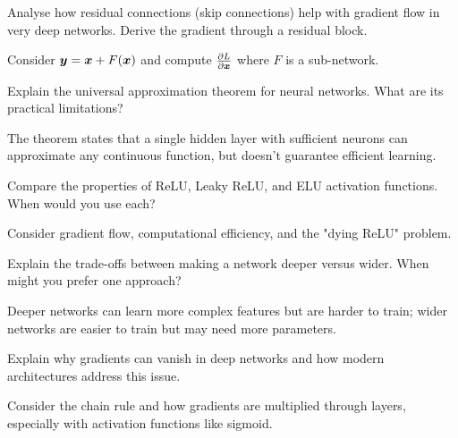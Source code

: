\begin{exercisebox}[hard]
\begin{problem}
Analyse how residual connections (skip connections) help with gradient flow in very deep networks. Derive the gradient through a residual block.
\end{problem}
\begin{hintbox}
Consider $\boldsymbol{y} = \boldsymbol{x} + F(\boldsymbol{x})$ and compute $\frac{\partial L}{\partial \boldsymbol{x}}$ where $F$ is a sub-network.
\end{hintbox}
\end{exercisebox}


\begin{exercisebox}[hard]
\begin{problem}
Explain the universal approximation theorem for neural networks. What are its practical limitations?
\end{problem}
\begin{hintbox}
The theorem states that a single hidden layer with sufficient neurons can approximate any continuous function, but doesn't guarantee efficient learning.
\end{hintbox}
\end{exercisebox}


\begin{exercisebox}[hard]
\begin{problem}
Compare the properties of ReLU, Leaky ReLU, and ELU activation functions. When would you use each?
\end{problem}
\begin{hintbox}
Consider gradient flow, computational efficiency, and the "dying ReLU" problem.
\end{hintbox}
\end{exercisebox}


\begin{exercisebox}[hard]
\begin{problem}
Explain the trade-offs between making a network deeper versus wider. When might you prefer one approach?
\end{problem}
\begin{hintbox}
Deeper networks can learn more complex features but are harder to train; wider networks are easier to train but may need more parameters.
\end{hintbox}
\end{exercisebox}


\begin{exercisebox}[hard]
\begin{problem}
Explain why gradients can vanish in deep networks and how modern architectures address this issue.
\end{problem}
\begin{hintbox}
Consider the chain rule and how gradients are multiplied through layers, especially with activation functions like sigmoid.
\end{hintbox}
\end{exercisebox}


